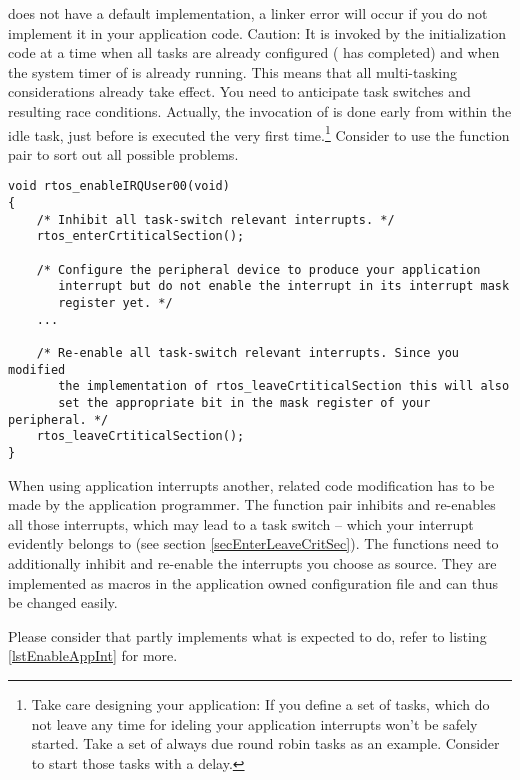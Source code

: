  does not have a default implementation, a
linker error will occur if you do not implement it in your application
code. Caution: It is invoked by the \rtos{} initialization code at a time
when all tasks are already configured ( has completed) and
when the system timer of \rtos{} is already running. This means that all
multi-tasking considerations already take effect. You need to anticipate
task switches and resulting race conditions. Actually, the invocation of
 is done early from within the idle task,
just before  is executed the very first time.\footnote{Take
care designing your application: If you define a set of tasks, which do
not leave any time for ideling your application interrupts won't be safely
started. Take a set of always due round robin tasks as an example.
Consider to start those tasks with a delay.} Consider to use the function
pair  to sort out all
possible problems.

\begin{lstlisting}[float, caption={Initialization of an application interrupt},
label=lstEnableAppInt, captionpos=b]
void rtos_enableIRQUser00(void)
{
    /* Inhibit all task-switch relevant interrupts. */
    rtos_enterCrtiticalSection();
    
    /* Configure the peripheral device to produce your application
       interrupt but do not enable the interrupt in its interrupt mask
       register yet. */
    ...
    
    /* Re-enable all task-switch relevant interrupts. Since you modified 
       the implementation of rtos_leaveCrtiticalSection this will also
       set the appropriate bit in the mask register of your peripheral. */
    rtos_leaveCrtiticalSection();
}
\end{lstlisting}

When using application interrupts another, related code modification has
to be made by the application programmer. The function pair
 inhibits and
re-enables all those interrupts, which may lead to a task switch -- which
your interrupt evidently belongs to (see section
\ref{secEnterLeaveCritSec}). The functions need to additionally inhibit
and re-enable the interrupts you choose as source. They are implemented as
macros in the application owned configuration file  and
can thus be changed easily.

Please consider that  partly
implements what  is expected to do, refer to
listing \ref{lstEnableAppInt} for more.

